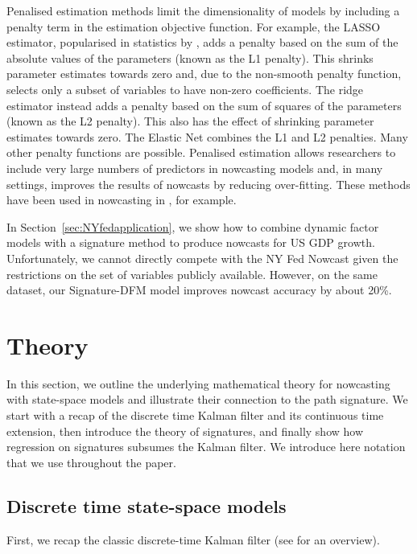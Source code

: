 \documentclass[a4paper, 12pt]{article}
\theoremstyle{remark}
\begin{document}
Penalised estimation methods limit the dimensionality of models by including a penalty term in the estimation objective function. For example, the LASSO estimator, popularised in statistics by \citet{tibshirani1996regression}, adds a penalty based on the sum of the absolute values of the parameters (known as the L1 penalty). This shrinks parameter estimates towards zero and, due to the non-smooth penalty function, selects only a subset of variables to have non-zero coefficients. The ridge estimator \citep{hoerl1970ridge} instead adds a penalty based on the sum of squares of the parameters (known as the L2 penalty). This also has the effect of shrinking parameter estimates towards zero. The Elastic Net \citep{zou2005regularization} combines the L1 and L2 penalties. Many other penalty functions are possible. Penalised estimation allows researchers to include very large numbers of predictors in nowcasting models and, in many settings, improves the results of nowcasts by reducing over-fitting. These methods have been used in nowcasting in \citet{babii2022machine}, for example.

In Section~\ref{sec:NYfedapplication}, we show how to combine dynamic factor models with a signature method to produce nowcasts for US GDP growth. Unfortunately, we cannot directly compete with the NY Fed Nowcast \citep{bok2018macroeconomic} given the restrictions on the set of variables publicly available. However, on the same dataset, our Signature-DFM model improves nowcast accuracy by about 20\%.  
\section{Theory}\label{sec:background}

In this section, we outline the underlying mathematical theory for nowcasting with state-space models and illustrate their connection to the path signature. We start with a recap of the discrete time Kalman filter and its continuous time extension, then introduce the theory of signatures, and finally show how regression on signatures subsumes the Kalman filter. We introduce here notation that we use throughout the paper.

\subsection{Discrete time state-space models}

First, we recap the classic discrete-time Kalman filter (see \citet{bertsekas2012dynamic} for an overview).
\end{document}
